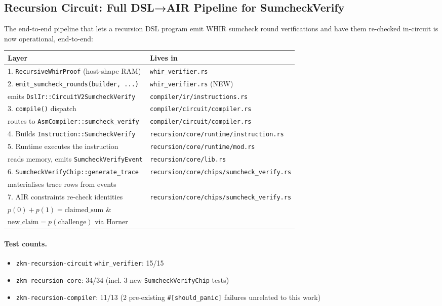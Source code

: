 \subsection{Recursion Circuit: Full DSL→AIR Pipeline for SumcheckVerify}

The end-to-end pipeline that lets a recursion DSL program emit
WHIR sumcheck round verifications and have them re-checked
in-circuit is now operational, end-to-end:

\begin{center}
\small
\begin{tabular}{ll}
\toprule
\textbf{Layer} & \textbf{Lives in} \\
\midrule
1. \texttt{RecursiveWhirProof} (host-shape RAM)
  & \texttt{whir\_verifier.rs} \\
2. \texttt{emit\_sumcheck\_rounds(builder, ...)}
  & \texttt{whir\_verifier.rs} (NEW) \\
\quad emits \texttt{DslIr::CircuitV2SumcheckVerify}
  & \texttt{compiler/ir/instructions.rs} \\
3. \texttt{compile()} dispatch
  & \texttt{compiler/circuit/compiler.rs} \\
\quad routes to \texttt{AsmCompiler::sumcheck\_verify}
  & \texttt{compiler/circuit/compiler.rs} \\
4. Builds \texttt{Instruction::SumcheckVerify}
  & \texttt{recursion/core/runtime/instruction.rs} \\
5. Runtime executes the instruction
  & \texttt{recursion/core/runtime/mod.rs} \\
\quad reads memory, emits \texttt{SumcheckVerifyEvent}
  & \texttt{recursion/core/lib.rs} \\
6. \texttt{SumcheckVerifyChip::generate\_trace}
  & \texttt{recursion/core/chips/sumcheck\_verify.rs} \\
\quad materialises trace rows from events
  &  \\
7. AIR constraints re-check identities
  & \texttt{recursion/core/chips/sumcheck\_verify.rs} \\
\quad $p(0)+p(1)=\text{claimed\_sum}$ \&  &  \\
\quad $\text{new\_claim} = p(\text{challenge})$ via Horner
  &  \\
\bottomrule
\end{tabular}
\end{center}

\paragraph{Test counts.}
\begin{itemize}
  \item \texttt{zkm-recursion-circuit} \texttt{whir\_verifier}: 15/15
  \item \texttt{zkm-recursion-core}: 34/34 (incl. 3 new
        \texttt{SumcheckVerifyChip} tests)
  \item \texttt{zkm-recursion-compiler}: 11/13 (2 pre-existing
        \texttt{\#[should\_panic]} failures unrelated to this work)
\end{itemize}


